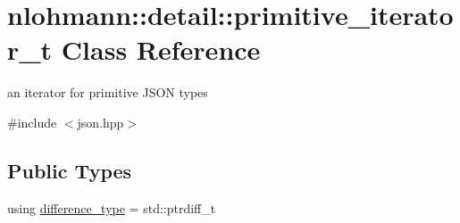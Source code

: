 \hypertarget{classnlohmann_1_1detail_1_1primitive__iterator__t}{}\section{nlohmann\+:\+:detail\+:\+:primitive\+\_\+iterator\+\_\+t Class Reference}
\label{classnlohmann_1_1detail_1_1primitive__iterator__t}


an iterator for primitive J\+S\+ON types  




{\ttfamily \#include $<$json.\+hpp$>$}

\subsection*{Public Types}
\begin{DoxyCompactItemize}
\item 
using \hyperlink{classnlohmann_1_1detail_1_1primitive__iterator__t_af3db0d5c90de427d51645fe73a015553}{difference\+\_\+type} = std\+::ptrdiff\+\_\+t
\end{DoxyCompactItemize}
